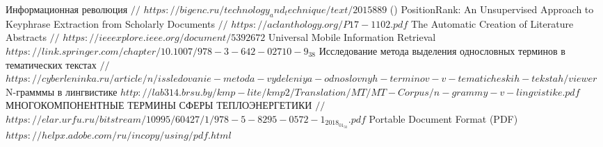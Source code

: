 \begin{thebibliography}{00}
	Информационная революция $//$ $https://bigenc.ru/technology_and_technique/text/2015889$ ()
	PositionRank: An Unsupervised Approach to Keyphrase Extraction
	from Scholarly Documents $//$
	$https://aclanthology.org/P17-1102.pdf$
	The Automatic Creation of Literature Abstracts $//$
	$https://ieeexplore.ieee.org/document/5392672$
	Universal Mobile Information Retrieval
	$https://link.springer.com/chapter/10.1007/978-3-642-02710-9_38$
	Исследование метода выделения однословных терминов в тематических текстах $//$
	$https://cyberleninka.ru/article/n/issledovanie-metoda-vydeleniya-odnoslovnyh-terminov-v-tematicheskih-tekstah/viewer$	
	N-грамммы в лингвистике
	$http://lab314.brsu.by/kmp-lite/kmp2/Translation/MT/MT-Corpus/n-grammy-v-lingvistike.pdf$
	МНОГОКОМПОНЕНТНЫЕ ТЕРМИНЫ СФЕРЫ ТЕПЛОЭНЕРГЕТИКИ $//$
	$https://elar.urfu.ru/bitstream/10995/60427/1/978-5-8295-0572-1_2018_01_50.pdf$
	Portable Document Format (PDF)
	$https://helpx.adobe.com/ru/incopy/using/pdf.html$
	
	
\end{thebibliography}

